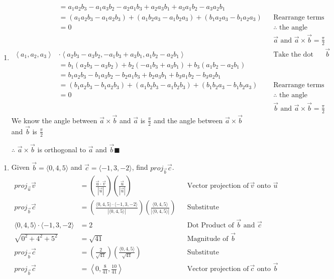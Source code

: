 \documentclass{article}
\newcommand{\qed}{\hfill$\blacksquare$}
\newenvironment{problem}[1]{
    \begin{enumerate}
        \item[\bfseries{#1}]
}
{
    \end{enumerate}
}
\begin{document}
\begin{problem}{4}
\begin{align*}
        &= a_1a_2b_3 - a_1a_3b_2 -a_2a_1b_3 + a_2a_3b_1 + a_3a_1b_2 - a_3a_2b_1\\
        &= (a_1a_2b_3 - a_1a_2b_3) + (a_1b_2a_3 - a_1b_2a_3) + (b_1a_2a_3 - b_1a_2a_3) && \text{Rearrange terms}\\
        &= 0 && \text{$\therefore$ the angle between}\\
        &&& \text{$\vec a$ and $\vec a \times \vec b = \frac{\pi}{2}$}\\
        \left\langle a_1, a_2, a_3 \right\rangle &\cdot\left\langle a_2b_3 - a_3b_2, -a_1b_3 + a_3b_1, a_1b_2 - a_2b_1 \right\rangle && \text{Take the dot product with $\vec b$}\\
        &= b_1(a_2b_3 - a_3b_2) + b_2(-a_1b_3 + a_3b_1) + b_3(a_1b_2 - a_2b_1)\\
        &= b_1a_2b_3 - b_1a_3b_2 -b_2a_1b_3 + b_2a_3b_1 + b_3a_1b_2 - b_3a_2b_1\\
        &= (b_1a_2b_3 - b_1a_2b_3) + (a_1b_2b_3 - a_1b_2b_3) + (b_1b_2a_3 - b_1b_2a_3) && \text{Rearrange terms}\\
        &= 0 && \text{$\therefore$ the angle between}\\
        &&& \text{$\vec b$ and $\vec a \times \vec b = \frac{\pi}{2}$}
    \end{align*}
    We know the angle between $\vec{a} \times \vec{b}$ and $\vec{a}$ is $\frac{\pi}{2}$ and the angle between $\vec{a} \times \vec{b}$ and $\vec{b}$ is $\frac{\pi}{2}$
    
    $\therefore$ $\vec{a} \times \vec{b}$ is orthogonal to $\vec{a}$ and $\vec{b}$\qed
\end{problem}
\newpage
\begin{problem}{6e}
    Given $\vec b = \langle 0, 4, 5\rangle$ and $\vec c = \langle -1, 3, -2\rangle$, find $proj_{\vec b}{\vec c}$.
    \begin{align*}
        proj_{\vec u}{\vec v} &= \left(\frac{\vec u \cdot \vec v}{\left|\vec u\right|}\right)\left(\frac{\vec u}{\left|\vec u\right|}\right) && \text{Vector projection of $\vec v$ onto $\vec u$}\\
        proj_{\vec b}{\vec c} &= \left(\frac{\langle 0, 4, 5\rangle \cdot \langle -1, 3, -2\rangle}{\left|\langle 0, 4, 5\rangle\right|}\right) \left(\frac{\langle 0, 4, 5\rangle}{\left|\langle 0, 4, 5\rangle\right|}\right) && \text{Substitute}\\
        \langle 0, 4, 5\rangle \cdot \langle -1, 3, -2\rangle &= 2 && \text{Dot Product of $\vec b$ and $\vec c$}\\
        \sqrt{0^2 + 4^2 + 5^2} &= \sqrt{41} && \text{Magnitude of $\vec b$}\\
        proj_{\vec b}{\vec c} &= \left(\frac{2}{\sqrt{41}}\right) \left(\frac{\langle 0, 4, 5\rangle}{\sqrt{41}}\right) && \text{Substitute}\\
        proj_{\vec b}{\vec c} &= \left\langle 0, \frac{8}{41}, \frac{10}{41} \right\rangle && \text{Vector projection of $\vec c$ onto $\vec b$}\\
    \end{align*}
\end{problem}
\end{document}
